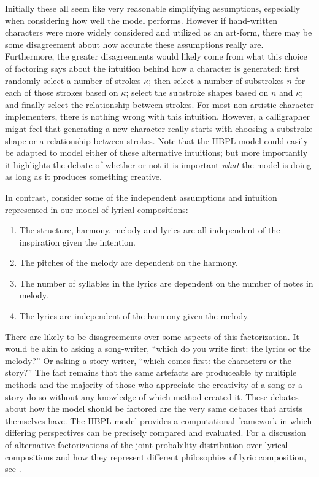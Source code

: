 \documentclass[letterpaper]{article}
\begin{document}
\noindent Initially these all seem like very reasonable simplifying assumptions, especially when considering how well the model performs. However if hand-written characters were more widely considered and utilized as an art-form, there may be some disagreement about how accurate these assumptions really are. Furthermore, the greater disagreements would likely come from what this choice of factoring says about the intuition behind how a character is generated: first randomly select a number of strokes $\kappa$; then select a number of substrokes $n$ for each of those strokes based on $\kappa$; select the substroke shapes based on $n$ and $\kappa$; and finally select the relationship between strokes. For most non-artistic character implementers, there is nothing wrong with this intuition. However, a calligrapher might feel that generating a new character really starts with choosing a substroke shape or a relationship between strokes. Note that the HBPL model could easily be adapted to model either of these alternative intuitions; but more importantly it highlights the debate of whether or not it is important \emph{what} the model is doing as long as it produces something creative.

In contrast, consider some of the independent assumptions and intuition represented in our model of lyrical compositions:

\begin{enumerate}  
\item The structure, harmony, melody and lyrics are all independent of the inspiration given the intention.
\item The pitches of the melody are dependent on the harmony.
\item The number of syllables in the lyrics are dependent on the number of notes in melody.
\item The lyrics are independent of the harmony given the melody.
\end{enumerate}

There are likely to be disagreements over some aspects of this factorization. It would be akin to asking a song-writer, ``which do you write first: the lyrics or the melody?'' Or asking a story-writer, ``which comes first: the characters or the story?'' The fact remains that the same artefacts are produceable by multiple methods and the majority of those who appreciate the creativity of a song or a story do so without any knowledge of which method created it. These debates about how the model should be factored are the very same debates that artists themselves have. The HBPL model provides a computational framework in which differing perspectives can be precisely compared and evaluated. For a discussion of alternative factorizations of the joint probability distribution over lyrical compositions and how they represent different philosophies of lyric composition, see \cite{bodily:inpress-a}.
\end{document}
